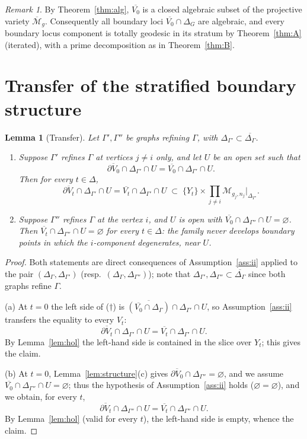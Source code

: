 \documentclass[11pt]{amsart}
\newtheorem{lemma}[theorem]{Lemma}
\theoremstyle{definition}
\theoremstyle{remark}
\newtheorem{remark}[theorem]{Remark}
\newcommand{\M}{\mathcal{M}}
\begin{document}
\begin{remark}
By Theorem~\ref{thm:alg}, $\overline{V_0}$ is a closed algebraic subset of
the projective variety $\overline{\M}_g$. Consequently all boundary loci
$\overline{V_0}\cap\Delta_G$ are algebraic, and every boundary locus
component is totally geodesic in its stratum by
Theorem~\ref{thm:A} (iterated), with a prime decomposition as in
Theorem~\ref{thm:B}.
\end{remark}

\section{Transfer of the stratified boundary structure}

\begin{lemma}[Transfer]\label{lem:transfer}
Let $\Gamma',\Gamma''$ be graphs refining $\Gamma$, with
$\Delta_{\Gamma'}\subset\overline{\Delta_\Gamma}$.
\begin{enumerate}
\item[(a)] Suppose $\Gamma'$ refines $\Gamma$ at vertices $j\neq i$ only,
and let $U$ be an open set such that
\[
\overline{\partial V_0}\cap\Delta_{\Gamma'}\cap U
=\overline{V_0}\cap\Delta_{\Gamma'}\cap U .
\tag{$\dagger$}
\]
Then for every $t\in\Delta$,
\[
\overline{\partial V_t}\cap\Delta_{\Gamma'}\cap U
=\overline{V_t}\cap\Delta_{\Gamma'}\cap U
\;\subset\;\{Y_t\}\times\prod_{j\neq i}\M_{g_j,n_j}\big|_{\Delta_{\Gamma'}} .
\]
\item[(b)] Suppose $\Gamma''$ refines $\Gamma$ at the vertex $i$, and
$U$ is open with
$\overline{V_0}\cap\Delta_{\Gamma''}\cap U=\varnothing$. Then
$\overline{V_t}\cap\Delta_{\Gamma''}\cap U=\varnothing$ for every
$t\in\Delta$: the family never develops boundary points in which the
$i$-component degenerates, near $U$.
\end{enumerate}
\end{lemma}

\begin{proof}
Both statements are direct consequences of Assumption~\ref{ass:ii} applied
to the pair $(\Delta_\Gamma,\Delta_{\Gamma'})$ (resp.\
$(\Delta_\Gamma,\Delta_{\Gamma''})$); note that
$\Delta_{\Gamma'},\Delta_{\Gamma''}\subset\overline{\Delta_\Gamma}$ since
both graphs refine $\Gamma$.

(a) At $t=0$ the left side of ($\dagger$) is
$\overline{(\overline{V_0}\cap\Delta_\Gamma)}\cap\Delta_{\Gamma'}\cap U$,
so Assumption~\ref{ass:ii} transfers the equality to every $V_t$:
\[
\overline{\partial V_t}\cap\Delta_{\Gamma'}\cap U
=\overline{V_t}\cap\Delta_{\Gamma'}\cap U .
\]
By Lemma~\ref{lem:hol} the left-hand side is contained in the slice over
$Y_t$; this gives the claim.

(b) At $t=0$, Lemma~\ref{lem:structure}(c) gives
$\overline{\partial V_0}\cap\Delta_{\Gamma''}=\varnothing$, and we assume
$\overline{V_0}\cap\Delta_{\Gamma''}\cap U=\varnothing$; thus the hypothesis
of Assumption~\ref{ass:ii} holds ($\varnothing=\varnothing$), and we obtain,
for every $t$,
\[
\overline{\partial V_t}\cap\Delta_{\Gamma''}\cap U
=\overline{V_t}\cap\Delta_{\Gamma''}\cap U .
\]
By Lemma~\ref{lem:hol} (valid for every $t$), the left-hand side is empty,
whence the claim.
\end{proof}
\end{document}
